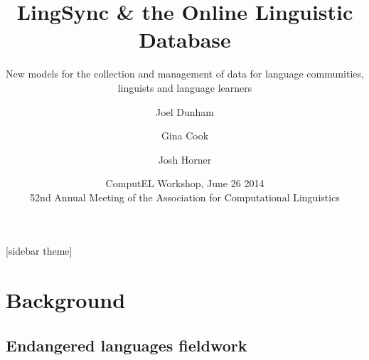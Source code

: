 \documentclass{beamer}
\begin{document}
\title[LingSync \& OLD] %
{LingSync \& the Online Linguistic Database}



\author[~]{Joel Dunham  \and Gina Cook  \and Josh Horner }


                      \subtitle
                      {New models for the collection and management of data for language communities, linguists and
                      language learners}



\date[ComputEL 2014] %
{ComputEL Workshop, June 26 2014\\52nd Annual Meeting of the Association for Computational Linguistics }



%

\begin{frame}
\titlepage
\end{frame}
[sidebar theme]

\section{Background}

\subsection[Fieldwork]{Endangered languages fieldwork}\label{sec:fieldwork}

\end{document}
